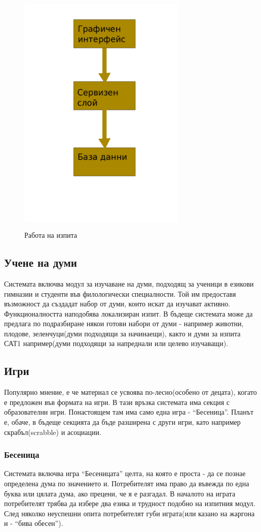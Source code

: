 \begin{figure}[htbp]
  \caption{Работа на изпита}
  \centering
  \includegraphics[width=80mm, height=120mm]{images/basic_arch.png}
\end{figure}

\subsection{Учене на думи}
Системата включва модул за изучаване на думи, подходящ за ученици в
езикови гимназии и студенти във филологически специалности. Той им
предоставя възможност да създадат набор от думи, които искат да
изучават активно. Функционалността наподобява локализиран изпит. В
бъдеще системата може да предлага по подразбиране някои готови набори
от думи - например животни, плодове, зеленчуци(думи подходящи за
начинаещи), както и думи за изпита САТ1 например(думи подходящи за
напреднали или целево изучаващи).
\subsection{Игри}
Популярно мнение, е че материал се усвоява по-лесно(особено от
децата), когато е предложен във формата на игри. В тази връзка
системата има секция с образователни игри. Понастоящем там има само
една игра - "`Бесеница"'. Планът е, обаче, в бъдеще секцията да бъде
разширена с други игри, като например скрабъл(scrabble) и асоциации.
\subsubsection{Бесеница}
Системата включва игра "`Бесеницата"' целта, на която е проста - да се
познае определена дума по значението и. Потребителят има право да
въвежда по една буква или цялата дума, ако прецени, че я е разгадал. В
началото на играта потребителят трябва да избере два езика и трудност
подобно на изпитния модул. След няколко неуспешни опита потребителят
губи играта(или казано на жаргона и - "`бива обесен"'). 
